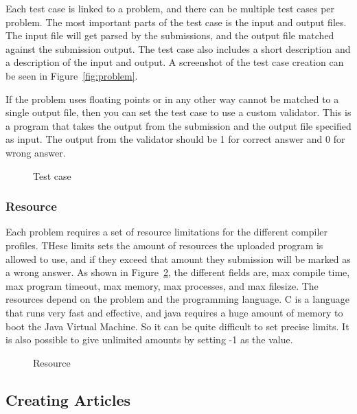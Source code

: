 Each test case is linked to a problem, and there can be multiple test
cases per problem. The most important parts of the test case is the
input and output files. The input file will get parsed by the
submissions, and the output file matched against the submission output.
The test case also includes a short description and a description of
the input and output. A screenshot of the test case creation can be
seen in Figure~\ref{fig:problem}. 


\bigskip

If the problem uses floating points or in any other way cannot be
matched to a single output file, then you can set the test case to use
a custom validator. This is a program that takes the output from the
submission and the output file specified as input. The output from the
validator should be 1 for correct answer and 0 for wrong answer. \ 

\begin{figure}
\centering
	\caption{Test case}
	\label{fig:testCase}
\end{figure}


\subsubsection{Resource}

Each problem requires a set of resource limitations for the different
compiler profiles. THese limits sets the amount of resources the
uploaded program is allowed to use, and if they exceed that amount they
submission will be marked as a wrong answer. As shown in Figure~\ref{fig:resource},
the different fields are, max compile time, max program timeout, max
memory, max processes, and max filesize. The resources depend on the
problem and the programming language. C is a language that runs very
fast and effective, and java requires a huge amount of memory to boot
the Java Virtual Machine. So it can be quite difficult to set precise
limits. It is also possible to give unlimited amounts by setting -1 as
the value.


\begin{figure}
\centering
	\caption{Resource}
	\label{fig:resource}
\end{figure}

\subsection{Creating Articles}

